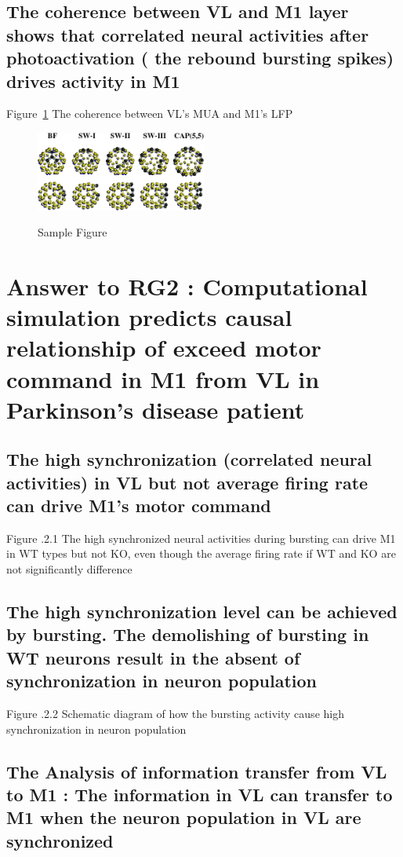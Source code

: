 \subsection{ The coherence between VL and M1 layer shows that correlated neural activities after photoactivation ( the rebound bursting spikes) drives activity in M1}

Figure~\ref{fig:sample} The coherence between VL’s MUA and M1’s LFP

\begin{figure}
	\centering
	\includegraphics[width=0.5\textwidth]{figures/sample-fig1}
	\label{fig:sample}
	\caption{Sample Figure}
\end{figure}

\section{Answer to RG2 : Computational simulation predicts causal relationship of exceed motor command in M1 from VL in Parkinson’s disease patient}

\subsection{ The high synchronization (correlated neural activities) in VL but not average firing rate can drive M1’s motor command}


Figure .2.1 The high synchronized neural activities during bursting can drive M1 in WT types but not KO, even though the average firing rate if WT and KO are not significantly difference


\subsection{  The high synchronization level can be achieved by bursting. The demolishing of bursting in WT neurons result in the absent of synchronization in neuron population}

Figure .2.2 Schematic diagram of how the bursting activity cause high synchronization in neuron population

\subsection{ The Analysis of information transfer from VL to M1 : The information in VL can transfer to M1 when the neuron population in VL are synchronized }

